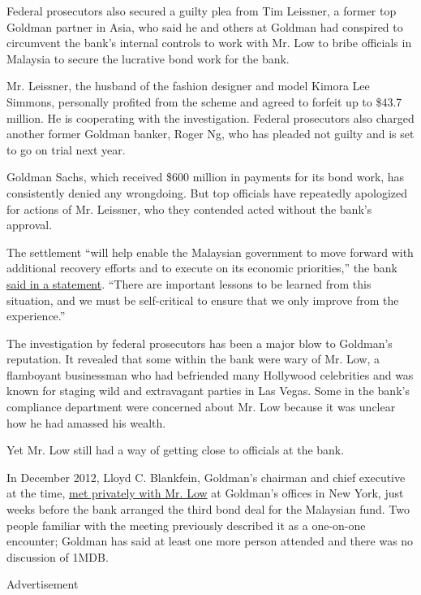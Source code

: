 Federal prosecutors also secured a guilty plea from Tim Leissner, a
former top Goldman partner in Asia, who said he and others at Goldman
had conspired to circumvent the bank's internal controls to work with
Mr. Low to bribe officials in Malaysia to secure the lucrative bond work
for the bank.

Mr. Leissner, the husband of the fashion designer and model Kimora Lee
Simmons, personally profited from the scheme and agreed to forfeit up to
\$43.7 million. He is cooperating with the investigation. Federal
prosecutors also charged another former Goldman banker, Roger Ng, who
has pleaded not guilty and is set to go on trial next year.

Goldman Sachs, which received \$600 million in payments for its bond
work, has consistently denied any wrongdoing. But top officials have
repeatedly apologized for actions of Mr. Leissner, who they contended
acted without the bank's approval.

The settlement ``will help enable the Malaysian government to move
forward with additional recovery efforts and to execute on its economic
priorities,'' the bank
\href{https://www.goldmansachs.com/media-relations/press-releases/current/statement-24-july-2020.html}{said
in a statement}. ``There are important lessons to be learned from this
situation, and we must be self-critical to ensure that we only improve
from the experience.''

The investigation by federal prosecutors has been a major blow to
Goldman's reputation. It revealed that some within the bank were wary of
Mr. Low, a flamboyant businessman who had befriended many Hollywood
celebrities and was known for staging wild and extravagant parties in
Las Vegas. Some in the bank's compliance department were concerned about
Mr. Low because it was unclear how he had amassed his wealth.

Yet Mr. Low still had a way of getting close to officials at the bank.

In December 2012, Lloyd C. Blankfein, Goldman's chairman and chief
executive at the time,
\href{https://www.nytimes3xbfgragh.onion/2018/11/22/business/goldman-blankfein-1mdb-malaysia.html}{met
privately with Mr. Low} at Goldman's offices in New York, just weeks
before the bank arranged the third bond deal for the Malaysian fund. Two
people familiar with the meeting previously described it as a one-on-one
encounter; Goldman has said at least one more person attended and there
was no discussion of 1MDB.

Advertisement

